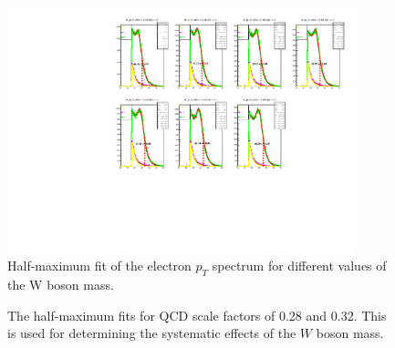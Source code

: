 \documentclass[a4paper]{report}
\numberwithin{equation}{section}
\begin{document}
\begin{figure}[htpb]
    \centering
    \includegraphics[width=0.9\textwidth]{hw_plots.pdf}
    \caption{Half-maximum fit of the electron $p_T$ spectrum for different values of the W boson mass.}
    \label{fig:hm_allmass}
\end{figure}

\begin{figure}[htb!]
	\centering
	\quad
	\centering
	\caption{The half-maximum fits for QCD scale factors of 0.28 and 0.32. This is used for determining the systematic 
    effects of the $W$ boson mass.}
	\label{fig:hm_qcd}
\end{figure}
\end{document}
